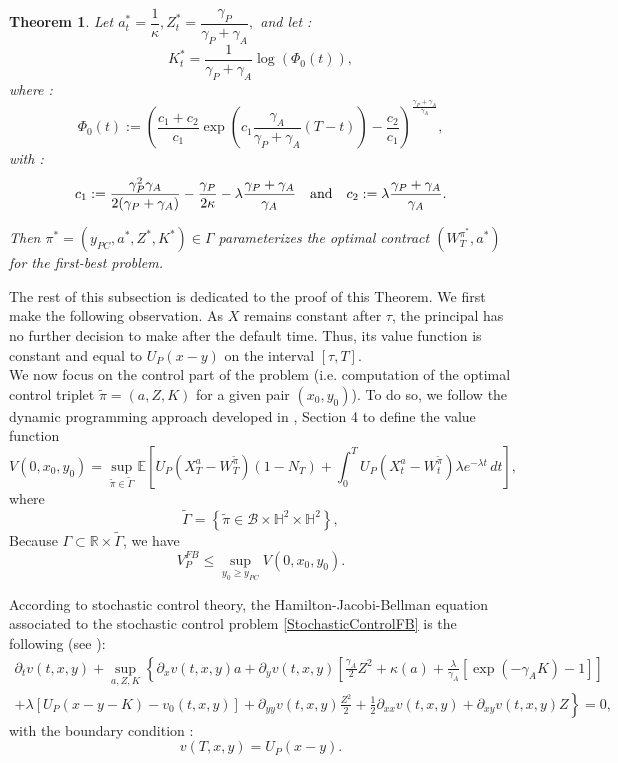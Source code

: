 \documentclass[numbook, envcountsect, envcountsame, envcountreset, runningheads, smallextended]{article}
\newtheorem{Theorem}{Theorem}[part]
\def \E{\mathbb{E}}
\def \R{\mathbb{R}}
\begin{document}
 \begin{Theorem}
\label{theo:mainFB}
Let  $a^*_t = \dfrac{1}{\kappa}, Z^*_t = \dfrac{\gamma_P}{\gamma_P + \gamma_A},$ and let : 
 $$ K^*_t = \frac{1}{\gamma_P + \gamma_A} \log(\Phi_0(t)) ,$$
where :
\begin{equation}
\label{eq:phi}
\Phi_0(t) := \left(  \frac{c_1 + c_2}{c_1} \exp\left(c_1 \frac{\gamma_A}{\gamma_P + \gamma_A}(T-t)\right) - \frac{c_2}{c_1}\right)^{\frac{\gamma_P+\gamma_A}{\gamma_A}} ,
\end{equation}
with :
$$ c_1 := \frac{\gamma_P^2 \gamma_A}{2(\gamma_P+\gamma_A) } - \frac{\gamma_P}{2\kappa} - \lambda \frac{\gamma_P + \gamma_A}{\gamma_A} \quad \text{and} \quad c_2 := \lambda \frac{\gamma_P + \gamma_A}{\gamma_A}.\\$$

Then $\pi^*=(y_{PC},a^*,Z^*,K^*) \in \Gamma$ parameterizes the optimal contract $(W^{\pi^*}_{T},a^*)$ for the first-best problem. 
\end{Theorem}

The rest of this subsection is dedicated to the proof of this Theorem.  We first make the following observation. As $X$ remains constant after $\tau$, the principal has no further decision to make after the default time. Thus, its value function is constant and equal to $ U_P(x-y)$ on the interval $[\tau,T]$.\\ 
We now focus on the control part of the problem (i.e. computation of the optimal control triplet $\tilde \pi=(a,Z,K)$ for a given pair $(x_0,y_0)$). To do so, we follow the dynamic programming approach developed in \cite{Pham:10}, Section 4
to define the value function  
\begin{equation}\label{StochasticControlFB}
V(0,x_0,y_0)=\sup_{\tilde \pi \in \tilde \Gamma} \E\left[ U_P(X_{T}^{a} - W_{T}^{\tilde \pi} )(1-N_T)+\int_0^T U_P(X_t^a-W_t^{\tilde \pi})\lambda e^{-\lambda t}\,dt \right],
\end{equation}
where
$$
\tilde \Gamma = \left\{ \tilde \pi \in \mathcal{B} \times   \mathbb{H}^2 \times \mathbb{H}^2\right\},$$
Because $\Gamma \subset \R\times\tilde\Gamma$, we have 
$$ V_P^{FB} \le \sup_{y_0 \geq y_{PC}} V(0,x_0,y_0).$$

According to stochastic control theory, the Hamilton-Jacobi-Bellman equation associated to the stochastic control problem \eqref{StochasticControlFB} is the following (see \cite{Oksendal}): 
\begin{align}
\label{eq:HJBFB}
\partial_t v(t,x,y) + \sup_{a,Z,K} \left\{ \partial_xv(t,x,y)a + \partial_yv(t,x,y) \left[\frac{\gamma_A}{2} Z^2 + \kappa(a) +  \frac{\lambda}{\gamma_A} [\exp(-\gamma_A K) - 1]\right] \right. \nonumber\\
\left.+ \lambda \left[ U_P(x-y-K) - v_0(t,x,y)\right]+ \partial_{yy} v(t,x,y) \frac{Z^2}{2} + \frac{1}{2} \partial_{xx} v(t,x,y)+ \partial_{xy}v(t,x,y) Z 
 \right\} = 0,
\end{align}
with the boundary condition :
$$v(T,x,y) =  U_P(x-y).$$
\end{document}
